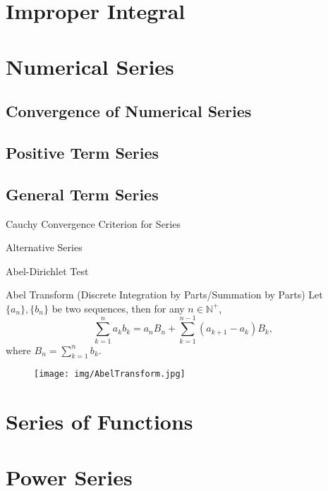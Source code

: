 \documentclass[11pt]{../../TexTemplate/elegantbook}
\begin{document}
\chapter{Improper Integral}


\chapter{Numerical Series}
\section{Convergence of Numerical Series}

\section{Positive Term Series}

\section{General Term Series}
\begin{leftbarTitle}{Cauchy Convergence Criterion for Series}\end{leftbarTitle}

\begin{leftbarTitle}{Alternative Series}\end{leftbarTitle}

\begin{leftbarTitle}{Abel-Dirichlet Test}\end{leftbarTitle}

\begin{theorem}{Abel Transform (Discrete Integration by Parts/Summation by Parts)}\label{thm:Abel Transform}
    Let \(\{a_n\}, \{b_n\}\) be two sequences, then for any \(n\in \mathbb{N}^{+}\),
    \[
        \sum_{k=1}^{n} a_k b_k = a_n B_n + \sum_{k=1}^{n-1} (a_{k+1} - a_{k})B_k,
    \]
    where \(B_n = \sum_{k=1}^{n} b_k\).
\end{theorem}

\begin{figure}[h]
    \centering
    \texttt{[image: img/AbelTransform.jpg]}
\end{figure}


\chapter{Series of Functions}

\chapter{Power Series}
\end{document}
